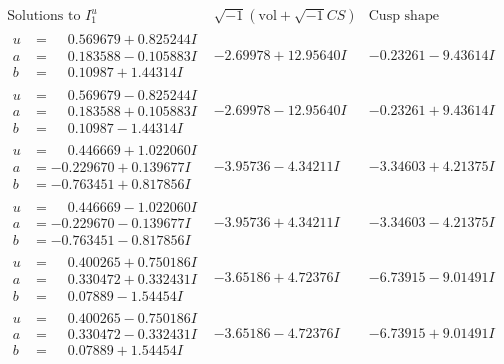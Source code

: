 \documentclass[1p]{elsarticle_modified}
\theoremstyle{definition}
\newcommand{\I}{\sqrt{-1}}
\begin{document}
$$\begin{array}{c|c|c}  
\text{Solutions to }I^u_{1}& \I (\text{vol} + \sqrt{-1}CS) & \text{Cusp shape}\\
 \hline 
\begin{aligned}
u &= \phantom{-}0.569679 + 0.825244 I \\
a &= \phantom{-}0.183588 - 0.105883 I \\
b &= \phantom{-}0.10987 + 1.44314 I\end{aligned}
 & -2.69978 + 12.95640 I & -0.23261 - 9.43614 I \\ \hline\begin{aligned}
u &= \phantom{-}0.569679 - 0.825244 I \\
a &= \phantom{-}0.183588 + 0.105883 I \\
b &= \phantom{-}0.10987 - 1.44314 I\end{aligned}
 & -2.69978 - 12.95640 I & -0.23261 + 9.43614 I \\ \hline\begin{aligned}
u &= \phantom{-}0.446669 + 1.022060 I \\
a &= -0.229670 + 0.139677 I \\
b &= -0.763451 + 0.817856 I\end{aligned}
 & -3.95736 - 4.34211 I & -3.34603 + 4.21375 I \\ \hline\begin{aligned}
u &= \phantom{-}0.446669 - 1.022060 I \\
a &= -0.229670 - 0.139677 I \\
b &= -0.763451 - 0.817856 I\end{aligned}
 & -3.95736 + 4.34211 I & -3.34603 - 4.21375 I \\ \hline\begin{aligned}
u &= \phantom{-}0.400265 + 0.750186 I \\
a &= \phantom{-}0.330472 + 0.332431 I \\
b &= \phantom{-}0.07889 - 1.54454 I\end{aligned}
 & -3.65186 + 4.72376 I & -6.73915 - 9.01491 I \\ \hline\begin{aligned}
u &= \phantom{-}0.400265 - 0.750186 I \\
a &= \phantom{-}0.330472 - 0.332431 I \\
b &= \phantom{-}0.07889 + 1.54454 I\end{aligned}
 & -3.65186 - 4.72376 I & -6.73915 + 9.01491 I \\ \hline\begin{aligned}

\end{aligned}
\end{array}$$
\end{document}
